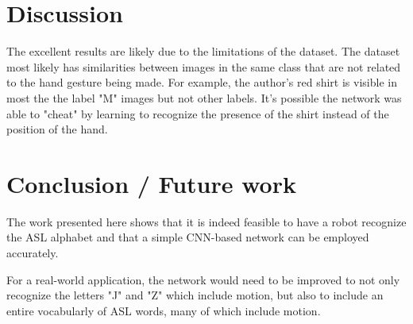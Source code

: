 \documentclass[10pt,journal,compsoc]{IEEEtran}
\begin{document}
\section{Discussion}
The excellent results are likely due to the limitations of the dataset. The dataset most likely has similarities between images in the same class that are not related to the hand gesture being made. For example, the author's red shirt is visible in most the the label "M" images but not other labels. It's possible the network was able to "cheat" by learning to recognize the presence of the shirt instead of the position of the hand.

\section{Conclusion / Future work}
The work presented here shows that it is indeed feasible to have a robot recognize the ASL alphabet and that a simple CNN-based network can be employed accurately.

For a real-world application, the network would need to be improved to not only recognize the letters "J" and "Z" which include motion, but also to include an entire vocabularly of ASL words, many of which include motion.



\end{document}
